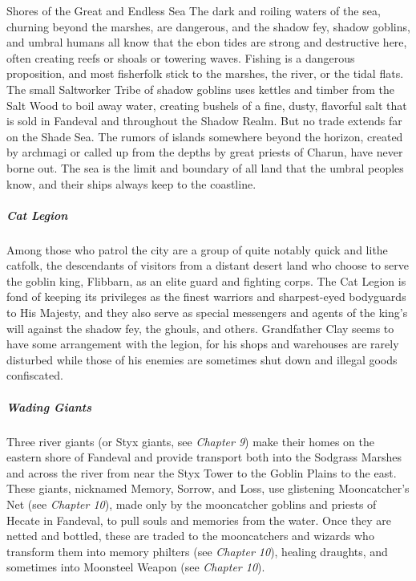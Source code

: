 \documentclass[10pt,a4paper,twoside,bg=print,twocolumn,openany,nodeprecatedcode]{dndbook}
\begin{document}
\begin{DndSidebar}[float=!b]{Shores of the Great and Endless Sea}
The dark and roiling waters of the sea, churning beyond the marshes, are dangerous, and the shadow fey, shadow goblins, and umbral humans all know that the ebon tides are strong and destructive here, often creating reefs or shoals or towering waves. Fishing is a dangerous proposition, and most fisherfolk stick to the marshes, the river, or the tidal flats. The small Saltworker Tribe of shadow goblins uses kettles and timber from the Salt Wood to boil away water, creating bushels of a fine, dusty, flavorful salt that is sold in Fandeval and throughout the Shadow Realm. But no trade extends far on the Shade Sea. The rumors of islands somewhere beyond the horizon, created by archmagi or called up from the depths by great priests of Charun, have never borne out. The sea is the limit and boundary of all land that the umbral peoples know, and their ships always keep to the coastline.



\end{DndSidebar}

\subparagraph{Cat Legion}
Among those who patrol the city are a group of quite notably quick and lithe catfolk, the descendants of visitors from a distant desert land who choose to serve the goblin king, Flibbarn, as an elite guard and fighting corps. The Cat Legion is fond of keeping its privileges as the finest warriors and sharpest-eyed bodyguards to His Majesty, and they also serve as special messengers and agents of the king's will against the shadow fey, the ghouls, and others. Grandfather Clay seems to have some arrangement with the legion, for his shops and warehouses are rarely disturbed while those of his enemies are sometimes shut down and illegal goods confiscated.

\subparagraph{Wading Giants}
Three river giants (or Styx giants, see \textit{Chapter 9}) make their homes on the eastern shore of Fandeval and provide transport both into the Sodgrass Marshes and across the river from near the Styx Tower to the Goblin Plains to the east. These giants, nicknamed Memory, Sorrow, and Loss, use glistening Mooncatcher's Net (see \textit{Chapter 10}), made only by the mooncatcher goblins and priests of Hecate in Fandeval, to pull souls and memories from the water. Once they are netted and bottled, these are traded to the mooncatchers and wizards who transform them into memory philters (see \textit{Chapter 10}), healing draughts, and sometimes into Moonsteel Weapon (see \textit{Chapter 10}).
\end{document}
